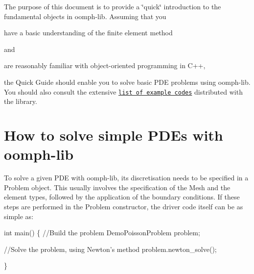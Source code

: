 The purpose of this document is to provide a \char`\"{}quick\char`\"{} introduction to the fundamental objects in {\ttfamily oomph-\/lib}. Assuming that you
\begin{DoxyItemize}
\item have a basic understanding of the finite element method
\end{DoxyItemize}and
\begin{DoxyItemize}
\item are reasonably familiar with object-\/oriented programming in C++,
\end{DoxyItemize}the Quick Guide should enable you to solve basic P\+DE problems using {\ttfamily oomph-\/lib}. You should also consult the extensive \href{../../example_code_list/html/index.html}{\tt list of example codes} distributed with the library.\hypertarget{index_main_how_to}{}\section{How to solve simple P\+D\+Es with oomph-\/lib}\label{index_main_how_to}
To solve a given P\+DE with {\ttfamily oomph-\/lib}, its discretisation needs to be specified in a {\ttfamily Problem} object. This usually involves the specification of the {\ttfamily Mesh} and the element types, followed by the application of the boundary conditions. If these steps are performed in the {\ttfamily Problem} constructor, the driver code itself can be as simple as\+:  
\begin{DoxyCodeInclude}
\textcolor{keywordtype}{int} main()
 \{
  \textcolor{comment}{//Build the problem }
  DemoPoissonProblem problem;

  \textcolor{comment}{//Solve the problem, using Newton's method}
  problem.newton\_solve();

 \}

\end{DoxyCodeInclude}


